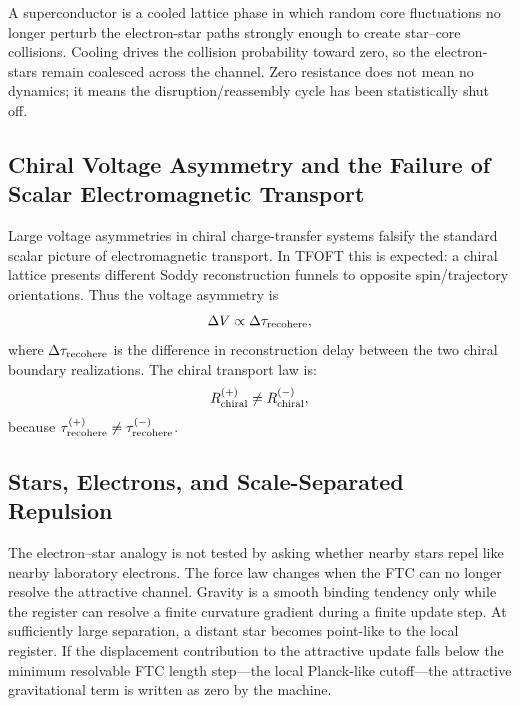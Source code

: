 \documentclass[11pt,a4paper]{article}
\begin{document}
A superconductor is a cooled lattice phase in which random core fluctuations no longer perturb the electron-star paths strongly enough to create star--core collisions. Cooling drives the collision probability toward zero, so the electron-stars remain coalesced across the channel. Zero resistance does not mean no dynamics; it means the disruption/reassembly cycle has been statistically shut off.


\subsection{Chiral Voltage Asymmetry and the Failure of Scalar Electromagnetic Transport}

Large voltage asymmetries in chiral charge-transfer systems falsify the
standard scalar picture of electromagnetic transport. In TFOFT this is
expected: a chiral lattice presents different Soddy reconstruction funnels to opposite spin/trajectory orientations. Thus the voltage asymmetry is
\begin{equation}
\Delta V \propto \Delta \tau_{\rm recohere},
\end{equation}
where \(\Delta \tau_{\rm recohere}\) is the difference in reconstruction
delay between the two chiral boundary realizations. The chiral transport law is:
\begin{equation}
R_{\rm chiral}^{(+)} \neq R_{\rm chiral}^{(-)},
\end{equation}
because \(\tau_{\rm recohere}^{(+)} \neq \tau_{\rm recohere}^{(-)}\).


\subsection{Stars, Electrons, and Scale-Separated Repulsion}

The electron--star analogy is not tested by asking whether nearby stars repel like nearby laboratory electrons. The force law changes when the FTC can no longer resolve the attractive channel. Gravity is a smooth binding tendency only while the register can resolve a finite curvature gradient during a finite update step. At sufficiently large separation, a distant star becomes point-like to the local register. If the displacement contribution to the attractive update falls below the minimum resolvable FTC length step---the local Planck-like cutoff---the attractive gravitational term is written as zero by the machine.
\end{document}
